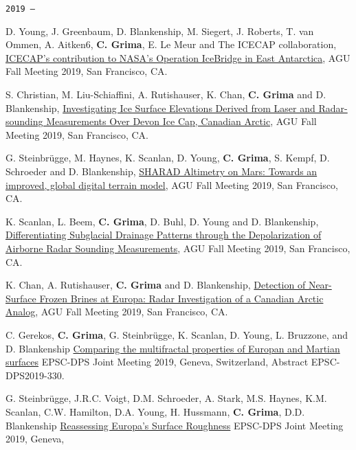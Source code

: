 \begin{etaremune}
\hspace{-2em}\texttt{2019 ---}

\item
  D. Young, J. Greenbaum, D. Blankenship, M. Siegert, J. Roberts, T. van Ommen, A. Aitken6, \textbf{C. Grima}, E. Le Meur and The ICECAP collaboration, \href{https://agu.confex.com/agu/fm19/meetingapp.cgi/Paper/610960}{ICECAP's contribution to NASA's Operation IceBridge in East Antarctica}, AGU Fall Meeting 2019, San Francisco, CA.
\item
  S. Christian, M. Liu-Schiaffini, A. Rutishauser, K. Chan, \textbf{C. Grima} and D. Blankenship, \href{https://agu.confex.com/agu/fm19/meetingapp.cgi/Paper/588389}{Investigating Ice Surface Elevations Derived from Laser and Radar-sounding Measurements Over Devon Ice Cap, Canadian Arctic}, AGU Fall Meeting 2019, San Francisco, CA.
\item
  G. Steinbrügge, M. Haynes, K. Scanlan, D. Young, \textbf{C. Grima}, S. Kempf, D. Schroeder and D. Blankenship, \href{https://agu.confex.com/agu/fm19/meetingapp.cgi/Paper/608483}{SHARAD Altimetry on Mars: Towards an improved, global digital terrain model}, AGU Fall Meeting 2019, San Francisco, CA.
\item
  K. Scanlan, L. Beem, \textbf{C. Grima}, D. Buhl, D. Young and D. Blankenship, \href{https://agu.confex.com/agu/fm19/meetingapp.cgi/Paper/600584}{Differentiating Subglacial Drainage Patterns through the Depolarization of Airborne Radar Sounding Measurements}, AGU Fall Meeting 2019, San Francisco, CA.
\item
  K. Chan, A. Rutishauser, \textbf{C. Grima} and D. Blankenship, \href{https://agu.confex.com/agu/fm19/meetingapp.cgi/Paper/591308}{Detection of Near-Surface Frozen Brines at Europa: Radar Investigation of a Canadian Arctic Analog}, AGU Fall Meeting 2019, San Francisco, CA.
\item
  C. Gerekos, \textbf{C. Grima}, G. Steinbrügge, K. Scanlan, D. Young,
  L. Bruzzone, and D. Blankenship
  \href{https://meetingorganizer.copernicus.org/EPSC-DPS2019/EPSC-DPS2019-330.pdf}{Comparing
  the multifractal properties of Europan and Martian surfaces} EPSC-DPS
  Joint Meeting 2019, Geneva, Switzerland, Abstract EPSC-DPS2019-330.
\item
  G. Steinbrügge, J.R.C. Voigt, D.M. Schroeder, A. Stark, M.S. Haynes,
  K.M. Scanlan, C.W. Hamilton, D.A. Young, H. Hussmann, \textbf{C.
  Grima}, D.D. Blankenship
  \href{https://meetingorganizer.copernicus.org/EPSC-DPS2019/EPSC-DPS2019-865-1.pdf}{Reassessing
  Europa's Surface Roughness} EPSC-DPS Joint Meeting 2019, Geneva,

\end{etaremune}
